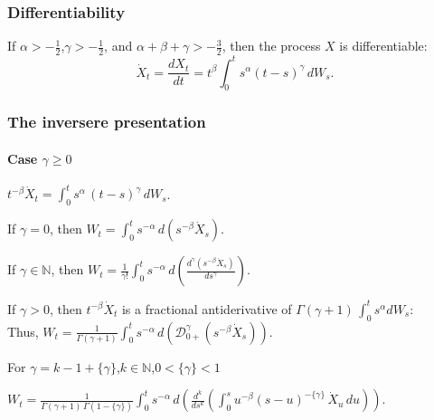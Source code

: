 \documentclass{beamer}
\theoremstyle{plain}
\theoremstyle{definition}
\theoremstyle{remark}
\begin{document}
\begin{frame}
\frametitle{Differentiability}
If $\displaystyle\alpha>-\frac12$,\quad $\displaystyle\gamma>-\frac12$, and
$\displaystyle\alpha+\beta+\gamma>-\frac32$, 
then
the process $X$ is differentiable:
\[
\dot X_t = \frac{d X_t}{dt} = t^\beta \int_0^t s^\alpha (t-s)^\gamma \, dW_s .
\]

\end{frame}
\begin{frame}
\frametitle{The inversere presentation}
\framesubtitle{Case $\gamma\ge 0$}
\centerline{$t^{-\beta} \dot X_t = \displaystyle \int_0^t s^\alpha \, (t-s)^\gamma \, dW_s$.}
If $\gamma=0$, then \quad
$\displaystyle W_t = \int_0^t   s^{-\alpha}  \, d(s^{-\beta} \dot X_s)$.

If $\gamma\in\mathbb{N}$, then \quad
$\displaystyle W_t = \frac{1}{\gamma!}
 \int_0^t   s^{-\alpha}  \, d\!\left(
\frac{d^\gamma (s^{-\beta} \dot X_s)}
{ds^\gamma} \right)$.

If $\gamma>0$, then $t^{-\beta} \dot X_t$ is
a fractional antiderivative of $\Gamma(\gamma+1)\, \int_0^t s^\alpha dW_s$:
\\
Thus,
$\displaystyle W_t = \frac{1}{\Gamma(\gamma+1)}
 \int_0^t   s^{-\alpha}  \, d\!\left(
\mathcal{D}^{\gamma}_{0+} (s^{-\beta} \dot X_s)
\right)$.

For $\gamma = k - 1 + \{\gamma\}$,\quad $k\in\mathbb{N}$,\quad $0<\{\gamma\}<1$
\centerline{$\displaystyle
W_t = \frac{1}{\Gamma(\gamma{+}1)\, \Gamma(1{-}\{\gamma\})}
\int_0^t s^{-\alpha}
\, d\!\left(
\frac{d^k}{ds^k} \!\left(
\int_0^s u^{-\beta} (s-u)^{-\{\gamma\}} \, \dot X_u \, du \right)
\right).$}
\end{frame}
\end{document}

